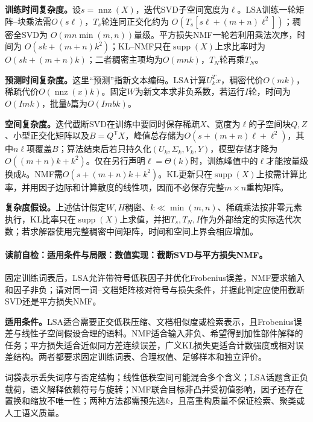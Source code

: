 \begin{complexitybox}
\textbf{训练时间复杂度。}设$s=\operatorname{nnz}(X)$，迭代SVD子空间宽度为$\ell$。LSA训练一轮矩阵--块乘法需$O(s\ell)$，$T_s$轮连同正交化约为
$O(T_s[s\ell+(m+n)\ell^2])$；稠密全SVD为
$O(mn\min(m,n))$量级。平方损失NMF一轮若利用乘法次序，时间为
$O(sk+(m+n)k^2)$；KL--NMF只在$\operatorname{supp}(X)$上求比率时为$O(sk+(m+n)k)$；二者稠密主项均为$O(mnk)$，$T_N$轮再乘$T_N$。

\textbf{预测时间复杂度。}这里“预测”指新文本编码。LSA计算$U_k^Tx$，稠密代价$O(mk)$，稀疏代价$O(\operatorname{nnz}(x)k)$。固定$W$为新文本求非负系数，若运行$I$轮，时间为$O(Imk)$，批量$b$篇为$O(Imbk)$。

\textbf{空间复杂度。}迭代截断SVD在训练中要同时保存稀疏$X$、宽度为$\ell$的子空间块$Q,Z$、小型正交化矩阵以及$B=Q^{\mathsf T}X$，峰值总存储为$O(s+(m+n)\ell+\ell^2)$，其中$n\ell$项覆盖$B$；算法结束后若只持久化$(U_k,\Sigma_k,V_k,Y)$，模型存储才降为$O((m+n)k+k^2)$。仅在另行声明$\ell=\Theta(k)$时，训练峰值中的$\ell$才能按量级换成$k$。NMF需$O(s+(m+n)k+k^2)$。KL更新只在$\operatorname{supp}(X)$上按需计算比率，并用因子边际和计算散度的线性项，因而不必保存完整$m\times n$重构矩阵。

\textbf{复杂度假设。}上述估计假定$W,H$稠密、$k\ll\min(m,n)$、稀疏乘法按非零元素执行，KL比率只在$\operatorname{supp}(X)$上求值，并把$T_s,T_N,I$作为外部给定的实际迭代次数；若求解器使用完整稠密中间矩阵，时间和空间上界会相应增加。
\end{complexitybox}

\label{struct:V4-C05-CH28}
\paragraph{读前自检：适用条件与局限：数值实现：截断SVD与平方损失NMF。}固定训练词表后，LSA允许带符号低秩因子并优化Frobenius误差，NMF要求输入和因子非负；请对同一词--文档矩阵核对符号与损失条件，并据此判定应使用截断SVD还是平方损失NMF。\par

\begin{applicabilitybox}
\textbf{适用条件。}LSA适合需要正交低秩压缩、文档相似度或检索表示，且Frobenius误差与线性子空间假设合理的语料。NMF适合输入非负、希望得到加性部件解释的任务；平方损失适合近似同方差连续误差，广义KL损失更适合计数强度或相对误差结构。两者都要求固定训练词表、合理权值、足够样本和独立评价。
\end{applicabilitybox}

\label{struct:V4-C05-CH29}
\begin{notapplicablebox}[title=\SLMethodLimitationsTitle]
词袋表示丢失词序与否定结构；线性低秩空间可能混合多个含义；LSA话题含正负载荷，语义解释依赖符号与旋转；NMF联合目标非凸并受初值影响，因子还存在置换和缩放不唯一性；两种方法都需预先选$k$，且高重构质量不保证检索、聚类或人工语义质量。
\end{notapplicablebox}

